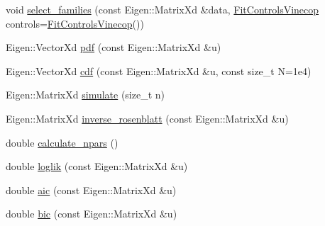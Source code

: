 \begin{DoxyCompactItemize}
$$\item 
void \hyperlink{classvinecopulib_1_1_vinecop_a15ca60a0770dab0786b134fc80d1e77d}{select\+\_\+families} (const Eigen\+::\+Matrix\+Xd \&data, \hyperlink{classvinecopulib_1_1_fit_controls_vinecop}{Fit\+Controls\+Vinecop} controls=\hyperlink{classvinecopulib_1_1_fit_controls_vinecop}{Fit\+Controls\+Vinecop}())
\item 
Eigen\+::\+Vector\+Xd \hyperlink{classvinecopulib_1_1_vinecop_adf3760b8dd2b6d3a9cae5426188d4489}{pdf} (const Eigen\+::\+Matrix\+Xd \&u)
\item 
Eigen\+::\+Vector\+Xd \hyperlink{classvinecopulib_1_1_vinecop_a379620d0bc7dd3cf5254517520cb3849}{cdf} (const Eigen\+::\+Matrix\+Xd \&u, const size\+\_\+t N=1e4)
\item 
Eigen\+::\+Matrix\+Xd \hyperlink{classvinecopulib_1_1_vinecop_aa88f63a1fa62dce205c4c197d9deb152}{simulate} (size\+\_\+t n)
\item 
Eigen\+::\+Matrix\+Xd \hyperlink{classvinecopulib_1_1_vinecop_ac64ae8072851ea1cd4ed7143cac92933}{inverse\+\_\+rosenblatt} (const Eigen\+::\+Matrix\+Xd \&u)
\item 
double \hyperlink{classvinecopulib_1_1_vinecop_a507ad836872f9f702eed22ba25212515}{calculate\+\_\+npars} ()
\item 
double \hyperlink{classvinecopulib_1_1_vinecop_a53105af3a02ad07af454333733c21495}{loglik} (const Eigen\+::\+Matrix\+Xd \&u)
\item 
double \hyperlink{classvinecopulib_1_1_vinecop_afab8444e538c976fa601ab946dd76252}{aic} (const Eigen\+::\+Matrix\+Xd \&u)
\item 
double \hyperlink{classvinecopulib_1_1_vinecop_a3bee8adb75dee19687309a40bbd72000}{bic} (const Eigen\+::\+Matrix\+Xd \&u)
\end{DoxyCompactItemize}
